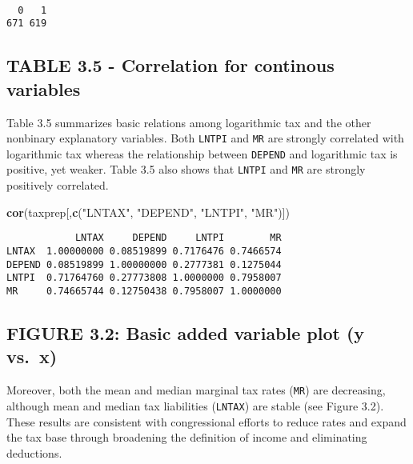 \documentclass[]{book}
\newenvironment{Shaded}{\begin{snugshade}}{\end{snugshade}}
\newcommand{\KeywordTok}[1]{\textcolor[rgb]{0.13,0.29,0.53}{\textbf{#1}}}
\newcommand{\NormalTok}[1]{#1}
\newcommand{\OperatorTok}[1]{\textcolor[rgb]{0.81,0.36,0.00}{\textbf{#1}}}
\newcommand{\StringTok}[1]{\textcolor[rgb]{0.31,0.60,0.02}{#1}}
\begin{document}
\begin{Shaded}
\end{Shaded}

\begin{verbatim}

  0   1 
671 619 
\end{verbatim}

\hypertarget{table-3.5---correlation-for-continous-variables}{%
\subsection{TABLE 3.5 - Correlation for continous variables}\label{table-3.5---correlation-for-continous-variables}}

Table 3.5 summarizes basic relations among logarithmic tax and the other nonbinary explanatory variables. Both \texttt{LNTPI} and \texttt{MR} are strongly correlated with logarithmic tax whereas the relationship between \texttt{DEPEND} and logarithmic tax is positive, yet weaker. Table 3.5 also shows that \texttt{LNTPI} and \texttt{MR} are strongly positively correlated.

\begin{Shaded}
\begin{Highlighting}[]
\KeywordTok{cor}\NormalTok{(taxprep[,}\KeywordTok{c}\NormalTok{(}\StringTok{"LNTAX"}\NormalTok{, }\StringTok{"DEPEND"}\NormalTok{, }\StringTok{"LNTPI"}\NormalTok{, }\StringTok{"MR"}\NormalTok{)])}
\end{Highlighting}
\end{Shaded}

\begin{verbatim}
            LNTAX     DEPEND     LNTPI        MR
LNTAX  1.00000000 0.08519899 0.7176476 0.7466574
DEPEND 0.08519899 1.00000000 0.2777381 0.1275044
LNTPI  0.71764760 0.27773808 1.0000000 0.7958007
MR     0.74665744 0.12750438 0.7958007 1.0000000
\end{verbatim}

\hypertarget{figure-3.2-basic-added-variable-plot-y-vs.-x}{%
\subsection{FIGURE 3.2: Basic added variable plot (y vs.~x)}\label{figure-3.2-basic-added-variable-plot-y-vs.-x}}

Moreover, both the mean and median marginal tax rates (\texttt{MR}) are decreasing, although mean and median tax liabilities (\texttt{LNTAX}) are stable (see Figure 3.2). These results are consistent with congressional efforts to reduce rates and expand the tax base through broadening the definition of income and eliminating deductions.
\end{document}
